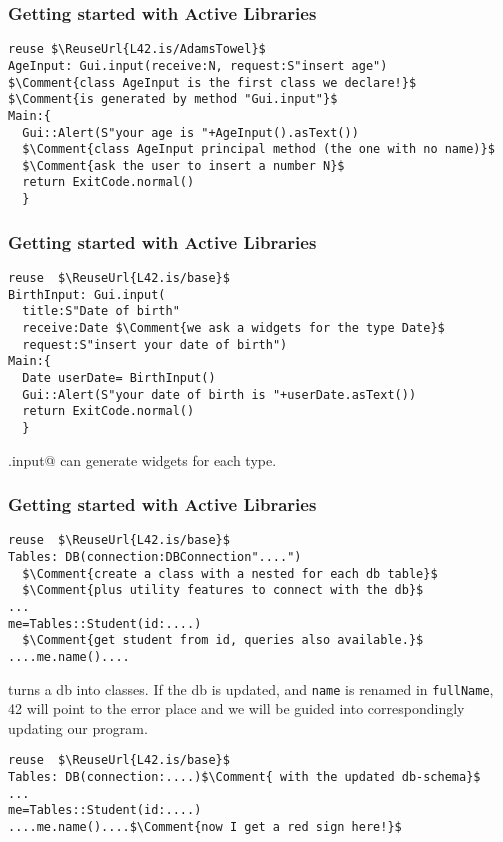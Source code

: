 \begin{frame}[fragile]
\frametitle{Getting started with Active Libraries}
\begin{NiceCode}{59ex}{1}
\begin{lstlisting}
reuse $\ReuseUrl{L42.is/AdamsTowel}$                                       
AgeInput: Gui.input(receive:N, request:S"insert age")
$\Comment{class AgeInput is the first class we declare!}$
$\Comment{is generated by method "Gui.input"}$
Main:{
  Gui::Alert(S"your age is "+AgeInput().asText())
  $\Comment{class AgeInput principal method (the one with no name)}$
  $\Comment{ask the user to insert a number N}$
  return ExitCode.normal()
  }
\end{lstlisting}
\end{NiceCode}
\end{frame}


\begin{frame}[fragile]
\frametitle{Getting started with Active Libraries}
\begin{NiceCode}{59ex}{1}
\begin{lstlisting}
reuse  $\ReuseUrl{L42.is/base}$
BirthInput: Gui.input(
  title:S"Date of birth"
  receive:Date $\Comment{we ask a widgets for the type Date}$
  request:S"insert your date of birth")
Main:{
  Date userDate= BirthInput()
  Gui::Alert(S"your date of birth is "+userDate.asText())
  return ExitCode.normal()
  }
\end{lstlisting}
\end{NiceCode}
\Q@Gui.input@ can generate widgets for each type.
\end{frame}



\begin{frame}[fragile]
\frametitle{Getting started with Active Libraries}
\begin{NiceCode}{59ex}{1}
\begin{lstlisting}
reuse  $\ReuseUrl{L42.is/base}$
Tables: DB(connection:DBConnection"....")
  $\Comment{create a class with a nested for each db table}$
  $\Comment{plus utility features to connect with the db}$
...
me=Tables::Student(id:....)
  $\Comment{get student from id, queries also available.}$
....me.name()....
\end{lstlisting}
\end{NiceCode}

\Q@DB@ turns a db into classes.
If the db is updated, and \texttt{name} is
renamed in \texttt{fullName},
42 will point to the error place and we will be guided into
correspondingly updating our program.

\begin{NiceCode}{59ex}{1}
\begin{lstlisting}
reuse  $\ReuseUrl{L42.is/base}$
Tables: DB(connection:....)$\Comment{ with the updated db-schema}$
...
me=Tables::Student(id:....)
....me.name()....$\Comment{now I get a red sign here!}$
\end{lstlisting}
\end{NiceCode}
\end{frame}

